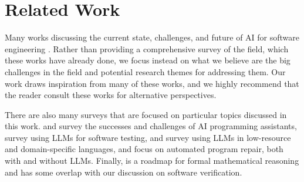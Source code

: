 \section{Related Work}


Many works discussing the current state, challenges, and future of AI for software engineering \citep{fan2023large, ozkaya2023application, wong2023natural, zheng2023survey, hou2024large, jin2024llms, wan2024deep}. Rather than providing a comprehensive survey of the field, which these works have already done, we focus instead on what we believe are the big challenges in the field and potential research themes for addressing them. Our work draws inspiration from many of these works, and we highly recommend that the reader consult these works for alternative perspectives. 

There are also many surveys that are focused on particular topics discussed in this work. \citet{liang2024large} and \citet{sergeyuk2025using} survey the successes and challenges of AI programming assistants, \citep{wang2024software} survey using LLMs for software testing, and \citet{joel2024survey} survey using LLMs in low-resource and domain-specific languages, and \citet{zhang2023survey} focus on automated program repair, both with and without LLMs. Finally, \citet{yang2024formal} is a roadmap for formal mathematical reasoning and has some overlap with our discussion on software verification.







